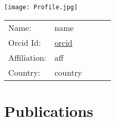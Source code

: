 \documentclass[12pt]{article}
\begin{document}
\pagestyle{CVfooter}

\begin{minipage}{.2\linewidth}
\centering
\texttt{[image: Profile.jpg]}
\vspace{2mm}
\end{minipage}
\begin{minipage}{.7\linewidth}
\noindent\begin{tabular}{l*{3}{l}r}
Name: & {{name}} \\[0.3cm]
Orcid Id: & \href{https://orcid.org/ {{orcid}} }{ {{orcid}} } \\[0.3cm]
Affiliation: & {{aff}} \\[0.3cm]
Country: & {{country}} \\[0.3cm]
\end{tabular}
\end {minipage}

\section*{Publications}
\vspace{2mm}

\end{document}
